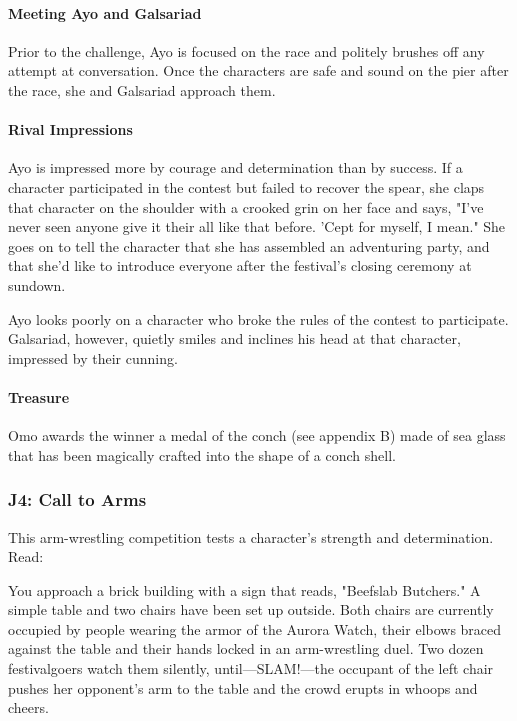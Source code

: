 \documentclass[10pt,a4paper,twoside,bg=print,twocolumn,openany,nodeprecatedcode]{dndbook}
\begin{document}
\paragraph{Meeting Ayo and Galsariad}
Prior to the challenge, Ayo is focused on the race and politely brushes off any attempt at conversation. Once the characters are safe and sound on the pier after the race, she and Galsariad approach them.

\paragraph{Rival Impressions}
Ayo is impressed more by courage and determination than by success. If a character participated in the contest but failed to recover the spear, she claps that character on the shoulder with a crooked grin on her face and says, "I've never seen anyone give it their all like that before. 'Cept for myself, I mean." She goes on to tell the character that she has assembled an adventuring party, and that she'd like to introduce everyone after the festival's closing ceremony at sundown.

Ayo looks poorly on a character who broke the rules of the contest to participate. Galsariad, however, quietly smiles and inclines his head at that character, impressed by their cunning.

\paragraph{Treasure}
Omo awards the winner a medal of the conch (see appendix B) made of sea glass that has been magically crafted into the shape of a conch shell.

\subsubsection{J4: Call to Arms}
This arm-wrestling competition tests a character's strength and determination. Read:

\begin{DndReadAloud}{}
You approach a brick building with a sign that reads, "Beefslab Butchers." A simple table and two chairs have been set up outside. Both chairs are currently occupied by people wearing the armor of the Aurora Watch, their elbows braced against the table and their hands locked in an arm-wrestling duel. Two dozen festivalgoers watch them silently, until—SLAM!—the occupant of the left chair pushes her opponent's arm to the table and the crowd erupts in whoops and cheers.

\end{DndReadAloud}
\end{document}
